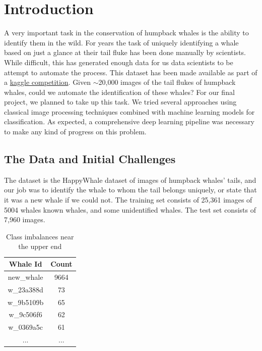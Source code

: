 \section{Introduction}
A very important task in the conservation of humpback whales is the ability to identify them in the wild. For years the task of uniquely identifying a whale based on just a glance at their tail fluke has been done manually by scientists. While difficult, this has generated enough data for us data scientists to be attempt to automate the process. This dataset has been made available as part of a \href{https://www.kaggle.com/c/humpback-whale-identification}{kaggle competition}. Given $\sim$20,000 images of the tail flukes of humpback whales, could we automate the identification of these whales? For our final project, we planned to take up this task. We tried several approaches using classical image processing techniques combined with machine learning models for classification. As expected, a comprehensive deep learning pipeline was necessary to make any kind of progress on this problem.

\subsection{The Data and Initial Challenges}\label{subs:datachallenges}

The dataset is the HappyWhale dataset of images of humpback whales' tails, and our job was to identify the whale to whom the tail belongs uniquely, or state that it was a new whale if we could not. The training set consists of 25,361 images of 5004 whales known whales, and some unidentified whales. The test set consists of 7,960 images.\\

\begin{table}[h!]
	\centering
	\begin{tabular}{|c|c|}\hline
		\textbf{Whale Id} & \textbf{Count}\\ \hline
		new\_whale  & 9664\\ \hline
		w\_23a388d  & 73\\ \hline
		w\_9b5109b  & 65\\ \hline
		w\_9c506f6  & 62\\ \hline
		w\_0369a5c  & 61\\ \hline
		...  & ...\\ \hline
	\end{tabular}
	\caption{\label{tab:counts}Class imbalances near the upper end}
\end{table}

